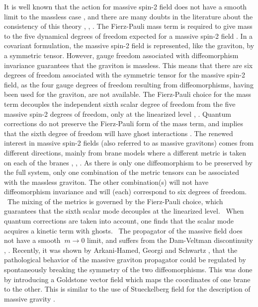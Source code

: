 \documentclass[a4paper,12pt]{article}
\begin{document}
It is well known that the action for massive spin-2 field does not have a
smooth limit to the massless case \cite{vv}, \cite{za} and there are many
doubts in the literature about the consistency of this theory \cite{bd},
\cite{dps}, \cite{nw}. The Fierz-Pauli mass term is required to give mass to
the five dynamical degrees of freedom expected for a massive spin-2 field
\cite{fp} . In a covariant formulation, the massive spin-2 field is
represented, like the graviton, by a symmetric tensor. However, gauge freedom
associated with diffeomorphism invariance guarantees that the graviton is
massless. This means that there are six degrees of freedom associated with the
symmetric tensor for the massive spin-2 field, as the four gauge degrees of
freedom resulting from diffeomorphisms, having been used for the graviton, are
not available. The Fierz-Pauli choice for the mass term decouples the
independent sixth scalar degree of freedom from the five massive spin-2
degrees of freedom, only at the linearized level \cite{bd}, \cite{dk}. Quantum
corrections do not preserve the Fierz-Pauli form of the mass term, and implies
that the sixth degree of freedom will have ghost interactions \cite{ss}. The
renewed interest in massive spin-2 fields (also referred to as massive
gravitons) comes from different directions, mainly from brane models where a
different metric is taken on each of the branes \cite{kmprs}, \cite{grs},
\cite{kr}. As there is only one diffeomorphism to be preserved by the full
system, only one combination of the metric tensors can be associated with the
massless graviton. The other combination(s) will not have diffeomorphism
invariance and will (each) correspond to six degrees of freedom. \ The mixing
of the metrics is governed by the Fierz-Pauli choice, which guarantees that
the sixth scalar mode decouples at the linearized level. \ When quantum
corrections are taken into account, one finds that the scalar mode acquires a
kinetic term with ghosts. \ The propagator of the massive field does not have
a smooth $\ m\rightarrow0$ limit, and suffers from the Dam-Veltman
discontinuity \cite{vv}, \cite{za}. Recently, it was shown by Arkani-Hamed,
Georgi and Schwartz \cite{ags}, that the pathological behavior of the massive
graviton propagator could be regulated by spontaneously breaking the symmetry
of the two diffeomorphisms. This was done by introducing a Goldstone vector
field which maps the coordinates of one brane to the other. This is similar to
the use of Stueckelberg field for the description of massive gravity
\cite{siegel}.
\end{document}
